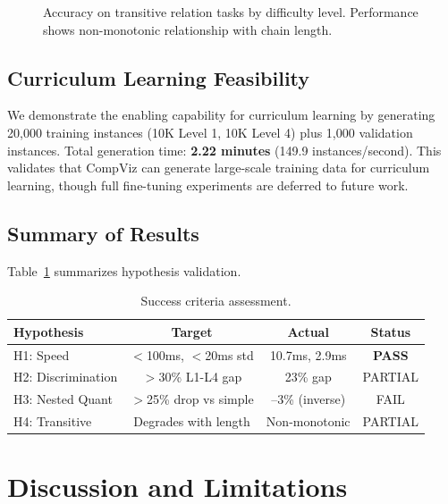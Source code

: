 \documentclass[11pt,a4paper]{article}
\begin{document}
\begin{figure}[t]
\centering
{}
\caption{Accuracy on transitive relation tasks by difficulty level. Performance shows non-monotonic relationship with chain length.}
\label{fig:transitive}
\end{figure}

\subsection{Curriculum Learning Feasibility}

We demonstrate the enabling capability for curriculum learning by generating 20,000 training instances (10K Level 1, 10K Level 4) plus 1,000 validation instances. Total generation time: \textbf{2.22 minutes} (149.9 instances/second). This validates that CompViz can generate large-scale training data for curriculum learning, though full fine-tuning experiments are deferred to future work.

\subsection{Summary of Results}

Table~\ref{tab:success} summarizes hypothesis validation.

\begin{table}[t]
\caption{Success criteria assessment.}
\label{tab:success}
\centering
\begin{tabular}{lccc}
\toprule
\textbf{Hypothesis} & \textbf{Target} & \textbf{Actual} & \textbf{Status} \\
\midrule
H1: Speed & $<$100ms, $<$20ms std & 10.7ms, 2.9ms & \textbf{PASS} \\
H2: Discrimination & $>$30\% L1-L4 gap & 23\% gap & PARTIAL \\
H3: Nested Quant & $>$25\% drop vs simple & --3\% (inverse) & FAIL \\
H4: Transitive & Degrades with length & Non-monotonic & PARTIAL \\
\bottomrule
\end{tabular}
\end{table}

\section{Discussion and Limitations}
\end{document}
